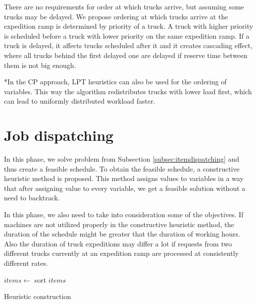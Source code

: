 \documentclass{ctuthesis}
\begin{document}
There are no requirements for order at which trucks arrive, but assuming some trucks may be delayed. We propose ordering at which trucks arrive at the expedition ramp is determined by priority of a truck. A truck with higher priority is scheduled before a truck with lower priority on the same expedition ramp. If a truck is delayed, it affects trucks scheduled after it and it creates cascading effect, where all trucks behind the first delayed one are delayed if reserve time between them is not big enough. 


*In the CP approach, LPT heuristics can also be used for the ordering of variables. This way the algorithm redistributes trucks with lower load first, which can lead to uniformly distributed workload faster.

\section{Job dispatching}

In this phase, we solve problem from Subsection \ref{subsec:itemdispatching} and thus create a feasible schedule.
To obtain the feasible schedule, a constructive heuristic method is proposed. This method assigns values to variables in a way that after assigning value to every variable, we get a feasible solution without a need to backtrack.


In this phase, we also need to take into consideration some of the objectives. If machines are not utilized properly in the constructive heuristic method, the duration of the schedule might be greater that the duration of working hours. Also the duration of truck expeditions may differ a lot if requests from two different trucks currently at an expedition ramp are processed at consistently different rates.

\begin{algorithm}[H]
\SetAlgoLined
{}
  $items \leftarrow$ sort $items$\;
\caption{Heuristic construction}
\end{algorithm}
\end{document}
